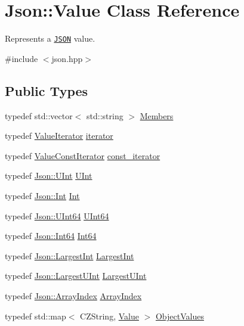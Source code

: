 \hypertarget{class_json_1_1_value}{\section{Json\-:\-:Value Class Reference}
\label{class_json_1_1_value}
}


Represents a \href{http://www.json.org}{\tt J\-S\-O\-N} value.  




{\ttfamily \#include $<$json.\-hpp$>$}

\subsection*{Public Types}
\begin{DoxyCompactItemize}
\item 
typedef std\-::vector$<$ std\-::string $>$ \hyperlink{class_json_1_1_value_ac61bab5a465848b57610379cc07995c3}{Members}
\item 
typedef \hyperlink{class_json_1_1_value_iterator}{Value\-Iterator} \hyperlink{class_json_1_1_value_a341cdf2e01f8b3c5b7317aa2f0768c53}{iterator}
\item 
typedef \hyperlink{class_json_1_1_value_const_iterator}{Value\-Const\-Iterator} \hyperlink{class_json_1_1_value_af92282ca92b58b320debd486afb7696a}{const\-\_\-iterator}
\item 
typedef \hyperlink{namespace_json_a800fb90eb6ee8d5d62b600c06f87f7d4}{Json\-::\-U\-Int} \hyperlink{class_json_1_1_value_a0933d59b45793ae4aade1757c322a98d}{U\-Int}
\item 
typedef \hyperlink{namespace_json_a08122e8005b706d982e48cca1e2119c7}{Json\-::\-Int} \hyperlink{class_json_1_1_value_abdf7a7ff73eb130ffcab28504ffdb405}{Int}
\item 
typedef \hyperlink{namespace_json_a01f20bce8f8229f38ff890168c0e6452}{Json\-::\-U\-Int64} \hyperlink{class_json_1_1_value_a8b62564be8c087c6d18de180ff4e13e3}{U\-Int64}
\item 
typedef \hyperlink{namespace_json_ab7b47d2905da3b4ae60e4e800ec9ae5f}{Json\-::\-Int64} \hyperlink{class_json_1_1_value_a1b86af9f85f0f1baa972c3319fa22695}{Int64}
\item 
typedef \hyperlink{namespace_json_a218d880af853ce786cd985e82571d297}{Json\-::\-Largest\-Int} \hyperlink{class_json_1_1_value_a1cbb82642ed05109b9833e49f042ece7}{Largest\-Int}
\item 
typedef \hyperlink{namespace_json_ae202ecad69725e23443f465e257456d0}{Json\-::\-Largest\-U\-Int} \hyperlink{class_json_1_1_value_a6682a3684d635e03fc06ba229fa24eec}{Largest\-U\-Int}
\item 
typedef \hyperlink{namespace_json_a8048e741f2177c3b5d9ede4a5b8c53c2}{Json\-::\-Array\-Index} \hyperlink{class_json_1_1_value_a184a91566cccca7b819240f0d5561c7d}{Array\-Index}
\item 
typedef std\-::map$<$ C\-Z\-String, \hyperlink{class_json_1_1_value}{Value} $>$ \hyperlink{class_json_1_1_value_a08b6c80c3af7071d908dabf044de5388}{Object\-Values}
\end{DoxyCompactItemize}
